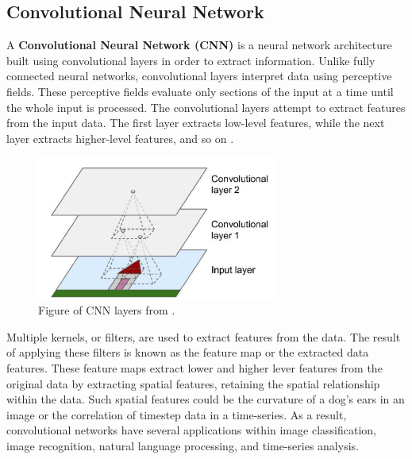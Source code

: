 \subsection{Convolutional Neural Network}
\label{section:BT:CNN}
A \textbf{Convolutional Neural Network (CNN)} is a neural network architecture built using convolutional layers in order to extract information.
Unlike fully connected neural networks, convolutional layers interpret data using perceptive fields.
These perceptive fields evaluate only sections of the input at a time until the whole input is processed.
The convolutional layers attempt to extract features from the input data.
The first layer extracts low-level features, while the next layer extracts higher-level features, and so on
\cite[p.~443-446]{Geron2017}.




\begin{figure}[h!]
  \centering
  \includegraphics[width=0.7\textwidth]{./sections/BT/figures/convolution_hands_one_machine_learning.png}
  \hfill
  \caption{Figure of CNN layers from \cite[p.~444]{Geron2017}.}
  \label{fig:convolution}
\end{figure}


Multiple kernels, or filters, are used to extract features from the data.
The result of applying these filters is known as the feature map or the extracted data features.
These feature maps extract lower and higher lever features from the original data by
extracting spatial features, retaining the spatial relationship within the data.
Such spatial features could be the curvature of a dog's ears in an image or the correlation of timestep data in a time-series.
As a result, convolutional networks have several applications within image classification,
image recognition, natural language processing, and time-series analysis.



